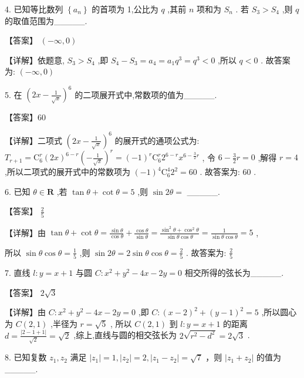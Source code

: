 \documentclass[10pt]{article}
\begin{document}
4. 已知等比数列 \(\left\{  {a}_{n}\right\}\) 的首项为 1,公比为 \(q\) ,其前 \(n\) 项和为 \({S}_{n}\) . 若 \({S}_{3} > {S}_{4}\) ,则 \(q\) 的取值范围为\_\_\_\_\_.

【答案】 \(\left( {-\infty ,0}\right)\)

【详解】依题意, \({S}_{3} > {S}_{4}\) ,即 \({S}_{4} - {S}_{3} = {a}_{4} = {a}_{1}{q}^{3} = {q}^{3} < 0\) ,所以 \(q < 0\) . 故答案为: \(\left( {-\infty ,0}\right)\)

5. 在 \({\left( 2x - \frac{1}{\sqrt{x}}\right) }^{6}\) 的二项展开式中,常数项的值为\_\_\_\_\_.

【答案】60

【详解】二项式 \({\left( 2x - \frac{1}{\sqrt{x}}\right) }^{6}\) 的展开式的通项公式为: \({T}_{r + 1} = {\mathrm{C}}_{6}^{r}{\left( 2x\right) }^{6 - r}{\left( -\frac{1}{\sqrt{x}}\right) }^{r} = {\left( -1\right) }^{r}{\mathrm{C}}_{6}^{r}{2}^{6 - r}{x}^{6 - \frac{3}{2}r}\) , 令 \(6 - \frac{3}{2}r = 0\) ,解得 \(r = 4\) ,所以二项式的展开式中的常数项为 \({\left( -1\right) }^{4}{\mathrm{C}}_{6}^{4}{2}^{2} = {60}\) . 故答案为: 60 .

6. 已知 \(\theta  \in  \mathbf{R}\) ,若 \(\tan \theta  + \cot \theta  = 5\) ,则 \(\sin {2\theta } =\) \_\_\_\_\_.

【答案】 \(\frac{2}{5}\)

【详解】由 \(\tan \theta  + \cot \theta  = \frac{\sin \theta }{\cos \theta } + \frac{\cos \theta }{\sin \theta } = \frac{{\sin }^{2}\theta  + {\cos }^{2}\theta }{\sin \theta \cos \theta } = \frac{1}{\sin \theta \cos \theta } = 5\) ,

所以 \(\sin \theta \cos \theta  = \frac{1}{5}\) ,则 \(\sin {2\theta } = 2\sin \theta \cos \theta  = \frac{2}{5}\) . 故答案为: \(\frac{2}{5}\)

7. 直线 \(l : y = x + 1\) 与圆 \(C : {x}^{2} + {y}^{2} - {4x} - {2y} = 0\) 相交所得的弦长为\_\_\_\_\_.

【答案】 \(2\sqrt{3}\)

【详解】由 \(C : {x}^{2} + {y}^{2} - {4x} - {2y} = 0\) ,即 \(C : {\left( x - 2\right) }^{2} + {\left( y - 1\right) }^{2} = 5\) ,所以圆心为 \(C\left( {2,1}\right)\) ,半径为 \(r = \sqrt{5}\) , 所以 \(C\left( {2,1}\right)\) 到 \(l : y = x + 1\) 的距离 \(d = \frac{\left| 2 - 1 + 1\right| }{\sqrt{2}} = \sqrt{2}\) ,综上,直线与圆的相交弦长为 \(2\sqrt{{r}^{2} - {d}^{2}} = 2\sqrt{3}\) .

8. 已知复数 \({z}_{1},{z}_{2}\) 满足 \(\left| {z}_{1}\right|  = 1,\left| {z}_{2}\right|  = 2,\left| {{z}_{1} - {z}_{2}}\right|  = \sqrt{7}\) ，则 \(\left| {{z}_{1} + {z}_{2}}\right|\) 的值为\_\_\_\_\_.
\end{document}
